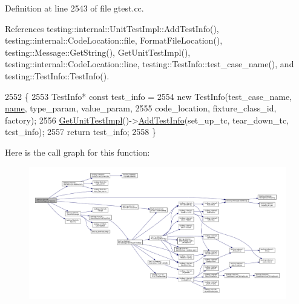 Definition at line 2543 of file gtest.\+cc.



References testing\+::internal\+::\+Unit\+Test\+Impl\+::\+Add\+Test\+Info(), testing\+::internal\+::\+Code\+Location\+::file, Format\+File\+Location(), testing\+::\+Message\+::\+Get\+String(), Get\+Unit\+Test\+Impl(), testing\+::internal\+::\+Code\+Location\+::line, testing\+::\+Test\+Info\+::test\+\_\+case\+\_\+name(), and testing\+::\+Test\+Info\+::\+Test\+Info().


\begin{DoxyCode}
2552                               \{
2553   TestInfo* \textcolor{keyword}{const} test\_info =
2554       \textcolor{keyword}{new} TestInfo(test\_case\_name, \hyperlink{namespaceinteractive__marker_a447655961b3d3ca3c5a2a9d3d769436d}{name}, type\_param, value\_param,
2555                    code\_location, fixture\_class\_id, factory);
2556   \hyperlink{namespacetesting_1_1internal_a9bd0caf5d16512de38b39599c13ee634}{GetUnitTestImpl}()->\hyperlink{classtesting_1_1internal_1_1UnitTestImpl_a1cc87dfc91377ebec4a3ff4192dfcba9}{AddTestInfo}(set\_up\_tc, tear\_down\_tc, test\_info);
2557   \textcolor{keywordflow}{return} test\_info;
2558 \}
\end{DoxyCode}
Here is the call graph for this function\+:
\nopagebreak
\begin{figure}[H]
\begin{center}
\leavevmode
\includegraphics[width=350pt]{namespacetesting_1_1internal_a7f2e4e46c969fcae9d801d93a3e932fd_cgraph}
\end{center}
\end{figure}
\mbox{\label{namespacetesting_1_1internal_a3fd0f30ec03d577bba3e1aa13241e17d}} 
